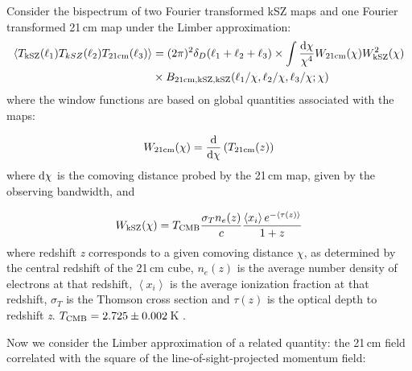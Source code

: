 Consider the bispectrum of two Fourier transformed kSZ maps and one Fourier transformed 21\,cm map under the Limber approximation:
\begin{equation}
\begin{split}
 \left\langle T_{\rm kSZ}(\ell_1) T_{kSZ}(\ell_2) T_{\rm 21cm}(\ell_3)\right\rangle &= 
(2\pi)^2 \delta_D(\ell_1 + \ell_2 + \ell_3) \times \int
 \frac{{\rm d}\chi}{\chi^4} W_{\rm 21cm}(\chi) W_{\rm kSZ}^2(\chi)  \\
 & \times B_{\rm 21cm, kSZ, kSZ}(\ell_1/\chi, \ell_2/\chi,  \ell_3/\chi; \chi)
\label{eq:bispec_limber}
\end{split}
\end{equation}
where the window functions are based on global quantities associated with the maps:

\begin{equation}
W_{\rm 21cm}(\chi) = {\rm \frac{d}{d\chi}}\left(T_{\rm 21cm}(z)\right)
\label{eq:W21cm}
\end{equation}
where ${\rm d\chi}$ is the comoving distance probed by the 21\,cm map, given by the observing bandwidth, and

\begin{equation}
W_{\rm kSZ}(\chi) = T_{\rm CMB} \frac{\sigma_T n_e(z)}{c}\frac{\left\langle x_i \right\rangle e^{-\left\langle \tau(z) \right\rangle } }{1+z}
\label{eq:WkSZ}
\end{equation}
where redshift \textit{z} corresponds to a given comoving distance $\chi$, as determined by the central redshift of the 21\,cm cube, $n_e(z)$ is the average number density of electrons at that redshift, $\left\langle x_i \right\rangle $ is the average ionization fraction at that redshift, $\sigma_T$ is the Thomson cross section and $\tau (z)$ is the optical depth to redshift \textit{z}. $T_{\rm CMB} = 2.725\pm0.002$\,K \citep{Mather.99, Fixsen.04}.

Now we consider the Limber approximation of a related quantity: the 21\,cm field correlated with the square of the line-of-sight-projected momentum field:

